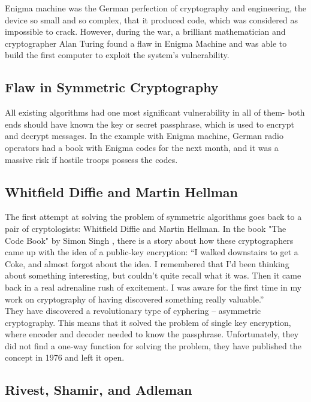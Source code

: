 \documentclass[a4paper, 12pt]{article}
\begin{document}
Enigma machine was the German
perfection of cryptography and engineering, the device so small and so complex, that it produced
code, which was considered as impossible to crack. However, during the war, a brilliant
mathematician and cryptographer Alan Turing found a flaw in Enigma Machine and was able to
build the first computer to exploit the system's vulnerability\cite{enigma}.\\

\subsection{Flaw in Symmetric Cryptography}
\label{bsec:flaw}

All existing algorithms had one most significant vulnerability in all of them- both ends should have
known the key or secret passphrase, which is used to encrypt and decrypt messages. In the example
with Enigma machine, German radio operators had a book with Enigma codes for the next month,
and it was a massive risk if hostile troops possess the codes. \\

\subsection{Whitfield Diffie and Martin Hellman}
\label{bsec:diffie}

The first attempt at solving the problem of symmetric algorithms goes back to a pair of
cryptologists: Whitfield Diffie and Martin Hellman. In the book "The Code Book" by Simon
Singh \cite{singh}, there is a story about how these cryptographers came up with the idea of a public-key
encryption: “I walked downstairs to get a Coke, and almost forgot about the idea. I remembered
that I'd been thinking about something interesting, but couldn't quite recall what it was. Then it
came back in a real adrenaline rush of excitement. I was aware for the first time in my work on
cryptography of having discovered something really valuable.”\\

They have discovered a revolutionary type of cyphering – asymmetric cryptography. This means that it solved the problem of
single key encryption, where encoder and decoder needed to know the passphrase. Unfortunately, they did not find a one-way function for
solving the problem, they have published the concept in 1976 and left it open.\\

\subsection{Rivest, Shamir, and Adleman}
\label{bsec:rsa}
\end{document}
